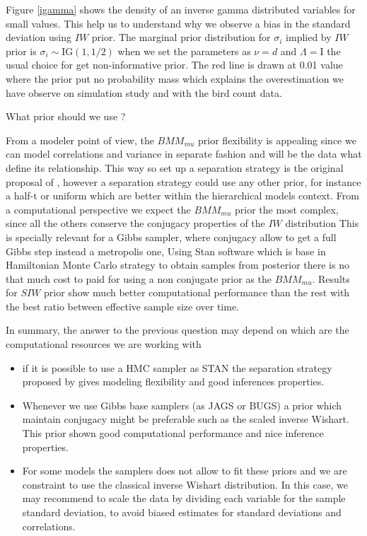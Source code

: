 \documentclass[a4paper]{article}
\newcommand{\I}{\mathrm{I}}
\begin{document}
Figure \ref{igamma} shows the density of an inverse gamma distributed variables for small values. This help us to understand why we observe a bias in the standard deviation using $IW$ prior. The marginal prior distribution for $\sigma_i$ implied by $IW$ prior is $\sigma_i \sim \mbox{IG}(1, 1/2)$ when we set the parameters as $\nu = d$ and $\Lambda=\I$ the usual choice for get non-informative prior. The red line is drawn at 0.01 value where the prior put no probability mass which explains the overestimation we have observe on simulation study and with the bird count data. 

 What prior should we use ? 

From a modeler point of view, the $BMM_{mu}$ prior flexibility is appealing since we can model correlations and variance in separate fashion and will be the data what define its relationship.  This way so set up a separation strategy is the original proposal of \cite{barnard2000}, however a separation strategy could use any other prior, for instance a half-t or uniform which are better within the hierarchical models context.  From a computational perspective we expect the $BMM_{mu}$ prior the most complex, since all the others conserve the conjugacy properties of the $IW$ distribution This is specially relevant for a Gibbs sampler, where conjugacy allow to get a full Gibbs step instead a metropolis one, Using Stan software which is base in Hamiltonian Monte Carlo strategy to obtain samples from posterior there is no that much cost to paid for using a non conjugate prior as the $BMM_{mu}$.  Results for $SIW$ prior show much better computational performance than the rest with the best ratio between effective sample size over time.  

In summary, the answer to the previous question may depend on which are the computational resources we are working with 
\begin{itemize}
\item  if it is possible to use a HMC sampler as STAN the separation strategy proposed by \cite{barnard2000} gives modeling flexibility and good inferences properties. 
\item Whenever we use Gibbs base samplers (as JAGS or BUGS) a prior which maintain conjugacy might be preferable such as the scaled inverse Wishart. This prior shown good computational performance and nice inference properties.  
\item For some models the samplers does not allow to fit these priors and we are constraint to use the classical inverse Wishart distribution. In this case, we may recommend to scale the data by dividing each variable for the sample standard deviation, to avoid biased estimates for standard deviations and correlations. 
\end{itemize}
\end{document}
